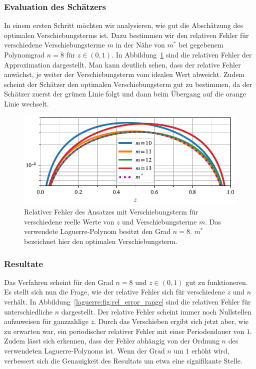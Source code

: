 \subsubsection{Evaluation des Schätzers}
In einem ersten Schritt möchten wir analysieren,
wie gut die Abschätzung des optimalen Verschiebungsterms ist.
Dazu bestimmen wir den relativen Fehler für verschiedene Verschiebungsterme $m$
in der Nähe von $m^*$ bei gegebenem Polynomgrad $n = 8$ für $z \in (0, 1)$.
In Abbildung~\ref{laguerre:fig:rel_error_shifted} sind die relativen Fehler
der Approximation dargestellt.
Man kann deutlich sehen,
dass der relative Fehler anwächst,
je weiter der Verschiebungsterm vom idealen Wert abweicht.
Zudem scheint der Schätzer den optimalen Verschiebungsterm gut zu bestimmen,
da der Schätzer zuerst der grünen Linie folgt und
dann beim Übergang auf die orange Linie wechselt.
\begin{figure}
\centering
% 
\includegraphics{papers/laguerre/images/rel_error_shifted.pdf}
\caption{Relativer Fehler des Ansatzes mit Verschiebungsterm
für verschiedene reelle Werte von $z$ und Verschiebungsterme $m$.
Das verwendete Laguerre-Polynom besitzt den Grad $n = 8$.
$m^*$ bezeichnet hier den optimalen Verschiebungsterm.}
\label{laguerre:fig:rel_error_shifted}
\end{figure}

\subsubsection{Resultate}
Das Verfahren scheint für den Grad $n=8$ und $z \in (0,1)$ gut zu funktioneren.
Es stellt sich nun die Frage,
wie der relative Fehler sich für verschiedene $z$ und $n$ verhält.
In Abbildung~\ref{laguerre:fig:rel_error_range} sind die relativen Fehler für
unterschiedliche $n$ dargestellt.
Der relative Fehler scheint immer noch Nullstellen aufzuweisen
für ganzzahlige $z$.
Durch das Verschieben ergibt sich jetzt aber,
wie zu erwarten war,
ein periodischer relativer Fehler mit einer Periodendauer von $1$.
Zudem lässt sich erkennen,
dass der Fehler abhängig von der Ordnung $n$
des verwendeten Laguerre-Polynoms ist.
Wenn der Grad $n$ um $1$ erhöht wird,
verbessert sich die Genauigkeit des Resultats um etwa eine signifikante Stelle.

